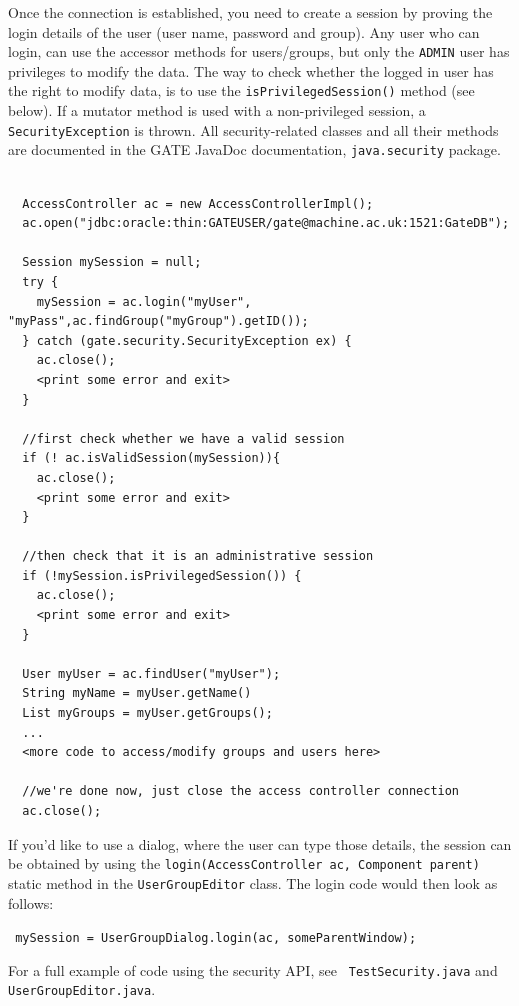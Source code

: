 Once the connection is established, you need to create a session by
proving the login details of the user (user name, password and group).
Any user who can login, can use the accessor methods for users/groups,
but only the {\tt ADMIN} user has privileges to modify the data. The way
to check whether the logged in user has the right to modify data, is to
use the {\tt isPrivilegedSession()} method (see below). If a mutator
method is used with a non-privileged session, a {\tt SecurityException} is
thrown. All security-related classes and all their methods are
documented in the GATE JavaDoc documentation, {\tt java.security}
package.
%
\nsmall
\begin{verbatim}

  AccessController ac = new AccessControllerImpl();
  ac.open("jdbc:oracle:thin:GATEUSER/gate@machine.ac.uk:1521:GateDB");

  Session mySession = null;
  try {
    mySession = ac.login("myUser", "myPass",ac.findGroup("myGroup").getID());
  } catch (gate.security.SecurityException ex) {
    ac.close();
    <print some error and exit>
  }

  //first check whether we have a valid session
  if (! ac.isValidSession(mySession)){
    ac.close();
    <print some error and exit>
  }

  //then check that it is an administrative session
  if (!mySession.isPrivilegedSession()) {
    ac.close();
    <print some error and exit>
  }

  User myUser = ac.findUser("myUser");
  String myName = myUser.getName()
  List myGroups = myUser.getGroups();
  ...
  <more code to access/modify groups and users here>

  //we're done now, just close the access controller connection
  ac.close();

\end{verbatim}
\nnormalsize
%
If you'd like to use a dialog, where the user can type those details,
the session can be obtained by using the {\tt login(AccessController ac,
Component parent)} static method in the {\tt UserGroupEditor} class. The
login code would then look as follows:

{\tt
  mySession = UserGroupDialog.login(ac, someParentWindow);
}

For a full example of code using the security API, see {\tt
TestSecurity.java} and {\tt UserGroupEditor.java}.


